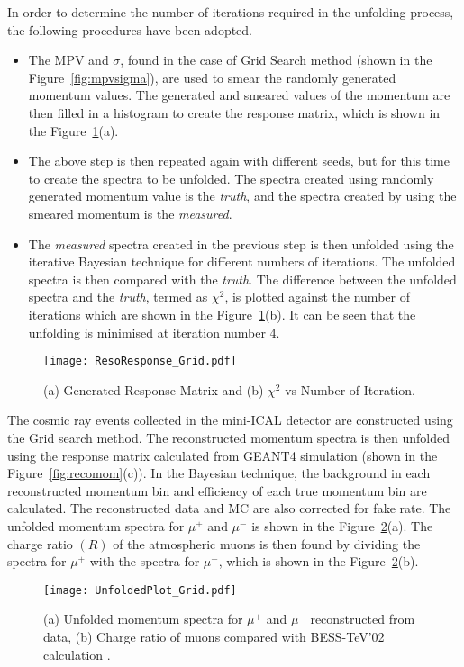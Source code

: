In order to determine the number of iterations required in the
unfolding process, the following procedures have been adopted.
\begin{itemize} %
\item The MPV and $\sigma$, found in the case of Grid Search method
  (shown in the Figure~\ref{fig:mpvsigma}), are used to smear
  the randomly generated momentum values. The generated and smeared
  values of the momentum are then filled in a histogram to create
  the response matrix, which is shown in the
  Figure~\ref{fig:unfolditer}(a).
\item The above step is then repeated again with different seeds,
  but for this time to create the spectra to be unfolded. The spectra
  created using randomly generated momentum value is the {\it truth},
  and the spectra created by using the smeared momentum is the
  {\it measured}.
\item The {\it measured} spectra created in the previous step is then
  unfolded using the iterative Bayesian technique for different numbers
  of iterations. The unfolded spectra is then compared with the
  {\it truth}. The difference between the unfolded spectra and the
  {\it truth}, termed as $\chi^{2}$, is plotted against the number of
  iterations which are shown in the Figure~\ref{fig:unfolditer}(b).
  It can be seen that the unfolding is minimised at iteration number 4.
\end{itemize}
\begin{figure}[h]
  \centering
  \texttt{[image: ResoResponse\_Grid.pdf]}
  \caption{(a) Generated Response Matrix and
    (b) $\chi^{2}$ vs Number of Iteration.}
  \label{fig:unfolditer}
\end{figure}

The cosmic ray events collected in the mini-ICAL detector are
constructed using the Grid search method. The reconstructed momentum
spectra is then unfolded using the response matrix calculated from
GEANT4 simulation (shown in the Figure~\ref{fig:recomom}(c)).
In the Bayesian technique, the background in each reconstructed
momentum bin and efficiency of each true momentum bin are calculated.
The reconstructed data and MC are also corrected for fake rate.
The unfolded momentum spectra for $\mu^{+}$ and $\mu^{-}$ is shown in
the Figure~\ref{fig:unfolddata}(a).
The charge ratio $(R)$ of the atmospheric muons is then found by
dividing the spectra for $\mu^{+}$ with the spectra for $\mu^{-}$,
which is shown in the Figure~\ref{fig:unfolddata}(b).
\begin{figure}[h]
  \centering
  \texttt{[image: UnfoldedPlot\_Grid.pdf]}
  \caption{(a) Unfolded momentum spectra for $\mu^{+}$ and $\mu^{-}$
    reconstructed from data, (b) Charge ratio of muons compared
    with BESS-TeV'02 calculation \cite{bess2002}.}
  \label{fig:unfolddata}
\end{figure}

